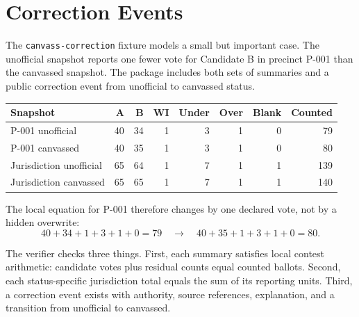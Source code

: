 \section{Correction Events}

The \texttt{canvass-correction} fixture models a small but important case. The
unofficial snapshot reports one fewer vote for Candidate B in precinct P-001
than the canvassed snapshot. The package includes both sets of summaries and a
public correction event from unofficial to canvassed status.

\begin{center}
\small
\begin{tabularx}{\textwidth}{lrrrrrrr}
\toprule
Snapshot & A & B & WI & Under & Over & Blank & Counted \\
\midrule
P-001 unofficial & 40 & 34 & 1 & 3 & 1 & 0 & 79 \\
P-001 canvassed & 40 & 35 & 1 & 3 & 1 & 0 & 80 \\
Jurisdiction unofficial & 65 & 64 & 1 & 7 & 1 & 1 & 139 \\
Jurisdiction canvassed & 65 & 65 & 1 & 7 & 1 & 1 & 140 \\
\bottomrule
\end{tabularx}
\end{center}

The local equation for P-001 therefore changes by one declared vote, not by a
hidden overwrite:
\[
  40 + 34 + 1 + 3 + 1 + 0 = 79
  \quad\rightarrow\quad
  40 + 35 + 1 + 3 + 1 + 0 = 80.
\]

The verifier checks three things. First, each summary satisfies local contest
arithmetic: candidate votes plus residual counts equal counted ballots. Second,
each status-specific jurisdiction total equals the sum of its reporting units.
Third, a correction event exists with authority, source references, explanation,
and a transition from unofficial to canvassed.

